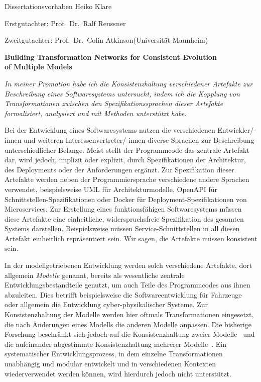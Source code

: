 \documentclass[a4paper,deutsch,CS,11pt,unnummeriert]{KITbrief}
\newcommand{\doktorand}{Heiko Klare}
\newcommand{\disstitle}{Building Transformation Networks for Consistent Evolution \\ of Multiple Models}
\newcommand{\referent}{Prof.~Dr.~Ralf Reussner\xspace}
\newcommand{\coreferentshort}{Prof.~Dr.~Colin Atkinson\xspace}
\newcommand{\coreferent}{\coreferentshort(Universität Mannheim)\xspace}
\newcommand\owncite[2][]{%
    \cite[#1]{#2}%
    \addtocategory{ownpublications}{#2}%
}
\begin{document}
{\Large Dissertationsvorhaben \doktorand}

Erstgutachter: \referent

\vspace{-0.35em}
Zweitgutachter: \coreferent

\vspace{0.5em}

\textbf{\Large \disstitle}

\vspace{0.15em}


\emph{In meiner Promotion habe ich die Konsistenzhaltung verschiedener Artefakte zur Beschreibung eines Softwaresystems untersucht, indem ich die Kopplung von Transformationen zwischen den Spezifikationssprachen dieser Artefakte formalisiert, analysiert und mit Methoden unterstützt habe.}

Bei der Entwicklung eines Softwaresystems nutzen die verschiedenen Entwickler/-innen und weiteren Interessenvertreter/-innen diverse Sprachen zur Beschreibung unterschiedlicher Belange.
Meist stellt der Programmcode das zentrale Artefakt dar, wird jedoch, implizit oder explizit, durch Spezifikationen der Architektur, des Deployments oder der Anforderungen ergänzt.
Zur Spezifikation dieser Artefakte werden neben der Programmiersprache verschiedene andere Sprachen verwendet, beispielsweise UML für Architekturmodelle, OpenAPI für Schnittstellen-Spezifikationen oder Docker für Deployment-Spezifikationen von Microservices.
Zur Erstellung eines funktionsfähigen Softwaresystems müssen diese Artefakte eine einheitliche, widerspruchsfreie Spezifikation des gesamten Systems darstellen.
Beispielsweise müssen Service-Schnittstellen in all diesen Artefakt einheitlich repräsentiert sein.
Wir sagen, die Artefakte müssen konsistent sein.

In der modellgetriebenen Entwicklung werden solch verschiedene Artefakte, dort allgemein \emph{Modelle} genannt, bereits als wesentliche zentrale Entwicklungsbestandteile genutzt, um auch Teile des Programmcodes aus ihnen abzuleiten.
Dies betrifft beispielsweise die Softwareentwicklung für Fahrzeuge~\owncite{guissouma2018study,sax2017survey} oder allgemein die Entwicklung cyber-physikalischer Systeme.
Zur Konsistenzhaltung der Modelle werden hier oftmals Transformationen eingesetzt, die nach Änderungen eines Modells die anderen Modelle anpassen.
Die bisherige Forschung beschränkt sich jedoch auf die Konsistenzhaltung zweier Modelle~\cite{stevens2020BidirectionalTransformationLarge-SoSym} und die aufeinander abgestimmte Konsistenzhaltung mehrerer Modelle~\cite{cleve2019dagstuhl,diskin2018MultiModelSynchronization-FASE}.
Ein systematischer Entwicklungsprozess, in dem einzelne Transformationen unabhängig und modular entwickelt und in verschiedenen Kontexten wiederverwendet werden können, wird hierdurch jedoch nicht unterstützt.
\end{document}
